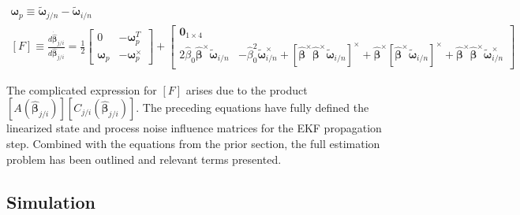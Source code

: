 \documentclass{aiaa-tc}
\newcommand{\B}[1]{\textbf{#1}} %
\newcommand{\BG}[1]{{\bm #1}}           %
\newcommand{\ddarg}[2]{\frac{d#1}{d#2}} %
\begin{document}
\begin{align}
\BG{\omega}_p \equiv \tilde{\BG{\omega}}_{j/n}-\tilde{\BG{\omega}}_{i/n} \\
[F] \equiv \ddarg{\dot{\hat{\BG{\beta}}}_{j/i}}{\hat{\BG{\beta}}_{j/i}} = \frac{1}{2}
\begin{bmatrix}
0 & -\BG{\omega}_p^T \\ \BG{\omega}_p & -\BG{\omega}_p^\times
\end{bmatrix} + \begin{bmatrix}
\B{0}_{1\times 4}\\
2\hat{\beta}_0 \hat{\BG{\beta}}^\times \tilde{\BG{\omega}}_{i/n} & -\hat{\beta}_0^2 \tilde{\BG{\omega}}_{i/n}^\times + [\hat{\BG{\beta}}^\times \hat{\BG{\beta}}^\times \tilde{\BG{\omega}}_{i/n}]^\times + \hat{\BG{\beta}}^\times [\hat{\BG{\beta}}^\times \tilde{\BG{\omega}}_{i/n}]^\times + \hat{\BG{\beta}}^\times \hat{\BG{\beta}}^\times \tilde{\BG{\omega}}_{i/n}^\times 
\end{bmatrix}
\end{align}

The complicated expression for $[F]$ arises due to the product $[A(\hat{\BG{\beta}}_{j/i})][C_{j/i}(\hat{\BG{\beta}}_{j/i})]$. The preceding equations have fully defined the linearized state and process noise influence matrices for the EKF propagation step. Combined with the equations from the prior section, the full estimation problem has been outlined and relevant terms presented.

\subsection{Simulation}



%

%
\end{document}

